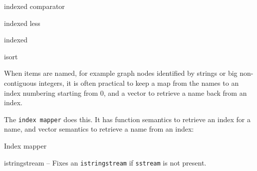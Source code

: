 \categorycontents{}


\begin{algorithm}{indexed comparator}
\end{algorithm}

\begin{algorithm}{indexed less}
\end{algorithm}

\begin{algorithm}{indexed}
\end{algorithm}

\begin{algorithm}{isort}
\end{algorithm}

When items are named, for example graph nodes identified by strings or big
non-contiguous integers, it is often practical to keep a map from the
names to an index numbering starting from 0, and a vector to retrieve a name
back from an index.

The {\tt index mapper} does this.
It has function semantics to retrieve an index for a name,
and vector semantics to retrieve a name from an index:
\begin{algorithm}{Index mapper}
\end{algorithm}

\begin{algorithm}{istringstream}
-- Fixes an {\tt istringstream} if {\tt sstream} is not present.
\end{algorithm}

\begin{sourceslandscape}
\end{sourceslandscape}
